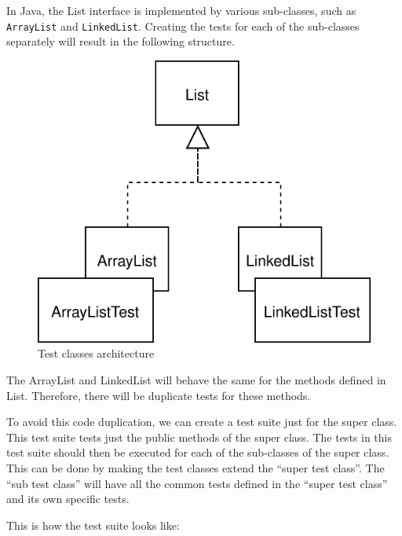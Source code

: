 In Java, the List interface is implemented by various sub-classes, such
as \texttt{ArrayList} and \texttt{LinkedList}. Creating the tests for
each of the sub-classes separately will result in the following
structure.

\begin{figure}
\centering
\includegraphics{img/design-by-contracts/examples/subclass_test.svg}
\caption{Test classes architecture}
\end{figure}

The ArrayList and LinkedList will behave the same for the methods
defined in List. Therefore, there will be duplicate tests for these
methods.

To avoid this code duplication, we can create a test suite just for the
super class. This test suite tests just the public methods of the super
class. The tests in this test suite should then be executed for each of
the sub-classes of the super class. This can be done by making the test
classes extend the ``super test class''. The ``sub test class'' will
have all the common tests defined in the ``super test class'' and its
own specific tests.

This is how the test suite looks like:

